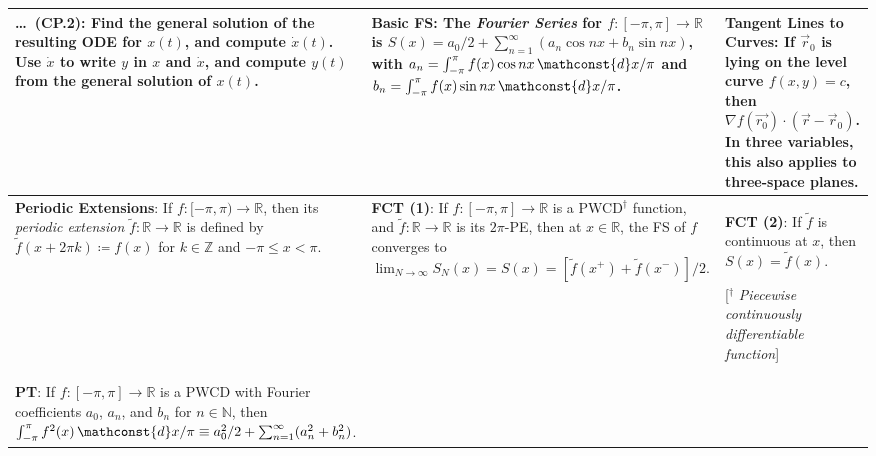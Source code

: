 \begin{tabular}{|m{.31\linewidth}|m{.31\linewidth}|m{.31\linewidth}|}
\hline

\textbf{\ldots\ (CP.2)}:
    Find the general solution of the resulting ODE for $ x(t) $, and compute
    $ \dot{x}(t) $. Use $ \dot{x} $ to write $ y $ in $ x $ and $ \dot{x} $,
    and compute $ y(t) $ from the general solution of $ x(t) $. &

\textbf{Basic FS}:
    The \emph{Fourier Series} for $f \colon [-\pi, \pi] \to \mathbb{R}$ is
        $ S(x) = a_0/2 + \sum_{n = 1}^\infty
            (a_n \cos nx + b_n \sin nx)$, with
        $ a_n = \int_{-\pi}^\pi
            f(x)\cos nx
            \,\mathconst{d}x / \pi $ and
        $ b_n = \int_{-\pi}^\pi
            f(x)\sin nx
            \,\mathconst{d}x / \pi $. &

\textbf{Tangent Lines to Curves}:
    If
        $ \vec{r}_0 $ is lying on the level curve $ f(x,y) = c $,
    then
        $ \nabla f(\vec{r_0}) \cdot (\vec{r} - \vec{r}_0) $.
    In three variables, this also applies to three-space planes. \\

\hline

\textbf{Periodic Extensions}:
    If
        $ f \colon [-\pi, \pi) \to \mathbb{R} $,
    then its \emph{periodic extension}
        $ \tilde{f} \colon \mathbb{R} \to \mathbb{R}$ is defined by
            $ \tilde{f}(x + 2\pi k) \coloneqq f(x)$ for
            $ k \in \mathbb{Z} $ and
            $ -\pi \leq x < \pi $. &

\textbf{FCT (1)}:
    If
        $ f \colon [-\pi, \pi] \to \mathbb{R} $ is a PWCD${}^\dagger$ function,
        and $ \tilde{f} \colon \mathbb{R} \to \mathbb{R}$ is its $ 2\pi $-PE,
    then
        at $ x \in \mathbb{R} $, the FS of $ f $ converges to
        $ \lim_{N \to \infty}
            S_N(x) = S(x) = [
                \tilde{f}(x^+) + \tilde{f}(x^-)
            ] / 2 $. &

\textbf{FCT (2)}:
    If
        $ \tilde{f} $ is continuous at $ x $,
    then
        $ S(x) = \tilde{f}(x) $.

    [$ {}^\dagger $ \emph{Piecewise continuously differentiable function}] \\

\hline

\textbf{PT}:
    If
        $ f \colon [-\pi, \pi] \to \mathbb{R} $ is a PWCD with Fourier
            coefficients $ a_0 $, $ a_n $, and $ b_n $
            for $ n \in \mathbb{N} $,
    then
        $ \int_{-\pi}^\pi
            f^2(x)
            \,\mathconst{d}x/\pi
        \equiv
            a_0^2 / 2 +
            \sum_{n = 1}^\infty (a_n^2 + b_n^2)$. &


\end{tabular}
